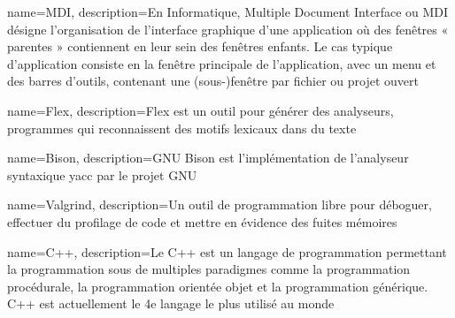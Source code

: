 \documentclass[a4paper, 12pt]{report}
\begin{document}
	{
		name={MDI},
		description={En Informatique, Multiple Document Interface ou MDI désigne l'organisation de l'interface graphique d'une application où des
		fenêtres « parentes » contiennent en leur sein des fenêtres enfants. Le cas typique d'application consiste en la fenêtre principale de l'application, avec un menu et des barres d'outils, contenant une (sous-)fenêtre par fichier ou projet ouvert}
	}

	{
		name={Flex},
		description={Flex est un outil pour générer des analyseurs, programmes qui reconnaissent des motifs lexicaux dans du texte}
	}

	{
		name={Bison},
		description={GNU Bison est l'implémentation de l'analyseur syntaxique yacc par le projet GNU}
	}

	{
		name={Valgrind},
		description={Un outil de programmation libre pour déboguer, effectuer du profilage 
		de code et mettre en évidence des fuites mémoires}
	}

	{
		name={C++},
		description={Le C++ est un langage de programmation permettant la programmation sous de multiples paradigmes comme la programmation
		procédurale, la programmation orientée objet et la programmation générique. C++ est actuellement le 4e langage le plus utilisé au monde}
	}
\end{document}
